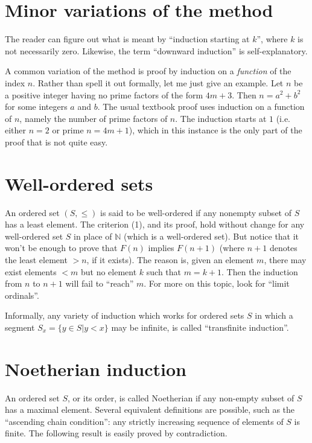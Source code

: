 \documentclass{article}
\begin{document}
\section{Minor variations of the method}

The reader can figure out what is meant by ``induction starting at $k$'',
where $k$ is not necessarily zero.
Likewise, the term ``downward induction'' is self-explanatory.

A common variation of the method is proof by induction on a
\emph{function} of the index $n$.
Rather than spell it out formally, let me just give an example.
Let $n$ be a positive integer having no prime factors of the form $4m+3$.
Then $n=a^2+b^2$ for some integers $a$ and $b$.
The usual textbook proof uses induction on a function of
$n$, namely the number of prime factors of $n$.
The induction starts at $1$ (i.e. either $n=2$
or prime $n=4m+1$), which in this
instance is the only part of the proof that is not quite easy.

\section{Well-ordered sets}
An ordered set $(S,\le)$ is said to be well-ordered if any nonempty subset
of $S$ has a least element.
The criterion (1), and its proof, hold without change for any well-ordered
set $S$ in place of $\mathbb{N}$ (which is a well-ordered set).
But notice that it won't be enough to prove that $F(n)$ implies $F(n+1)$
(where $n+1$ denotes the least element $>n$, if it exists).
The reason is, given an element $m$, there may exist
elements $<m$ but no element $k$ such that $m=k+1$.
Then the induction from $n$ to $n+1$ will fail to ``reach'' $m$.
For more on this topic, look for ``limit ordinals''.

Informally, any variety of induction which
works for ordered sets $S$ in which a segment
$S_x=\{y\in S | y<x\}$ may be infinite, is called ``transfinite induction''.

\section{Noetherian induction}
An ordered set $S$, or its order, is called Noetherian if any non-empty
subset of $S$ has a maximal element.
Several equivalent definitions are
possible, such as the ``ascending chain condition'':
any strictly increasing sequence of elements of $S$ is finite.
The following result is easily proved by contradiction.
\end{document}
